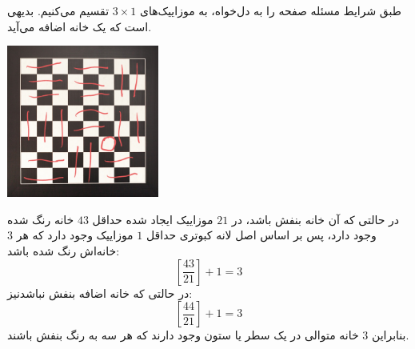 \p
طبق شرایط مسئله صفحه را به دل‌خواه، به موزاییک‌های 
$3\times1$ 
تقسیم می‌کنیم. بدیهی است که یک خانه اضافه می‌آید.
	\p
\begin{center}
    \includegraphics[height=5cm]{Q3Pic.jpg}
\end{center}
	\p
 در حالتی که آن خانه بنفش باشد، در
$21$ 
موزاییک ایجاد شده حداقل
$43$
خانه رنگ شده وجود دارد، پس بر اساس اصل لانه کبوتری حداقل 
$1$
موزاییک وجود دارد که هر 
$3$ 
خانه‌اش رنگ شده باشد:
\[[\frac {43} {21}]+1=3\]  
در حالتی که خانه اضافه بنفش نباشدنیز:
\[[\frac {44} {21}]+1=3\]  
بنابراین 
$3$
 خانه متوالی در یک سطر یا ستون وجود دارند که هر سه به رنگ بنفش باشند.